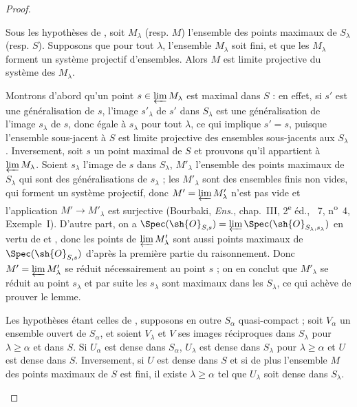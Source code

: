 \begin{proof}
\begin{lemma}[20.3.8.3]
\label{IV.20.3.8.3}
Sous les hypothèses de , soit $M_\lambda$ (resp. $M$) l'ensemble des points maximaux de $S_\lambda$ (resp. $S$).
Supposons que pour tout $\lambda$, l'ensemble $M_\lambda$ soit fini, et que les $M_\lambda$ forment un système projectif d'ensembles.
Alors $M$ est limite projective du système des $M_\lambda$.
\end{lemma}

Montrons d'abord qu'un point $s\in\varprojlim M_\lambda$ est maximal dans $S$ : en effet, si $s'$ est une généralisation de $s$, l'image $s'_\lambda$ de $s'$ dans $S_\lambda$ est une généralisation de l'image $s_\lambda$ de $s$, donc égale à $s_\lambda$ pour tout $\lambda$, ce qui implique $s'=s$, puisque l'ensemble sous-jacent à $S$ est limite projective des ensembles sous-jacents aux $S_\lambda$ .
Inversement, soit $s$ un point maximal de $S$ et prouvons qu'il appartient à $\varprojlim M_\lambda$.
Soient $s_\lambda$ l'image de $s$ dans $S_\lambda$, $M'_\lambda$ l'ensemble des points maximaux de $S_\lambda$ qui sont des généralisations de $s_\lambda$ ; les $M'_\lambda$ sont des ensembles finis non vides, qui forment un système projectif, donc $M'=\varprojlim M'_\lambda$ n'est pas vide et l'application $M'\to M'_\lambda$ est surjective (Bourbaki, \emph{Ens.}, chap.~III, 2\textsuperscript{e} éd., \textsection~7, n\textsuperscript{o}~4, Exemple~I).
D'autre part, on a $\Spec(\sh{O}_{S,s})=\varprojlim\Spec(\sh{O}_{S_\lambda,s_\lambda})$ en vertu de  et , donc les points de $\varprojlim M'_\lambda$ sont aussi points maximaux de $\Spec(\sh{O}_{S,s})$ d'après la première partie du raisonnement.
Donc $M'=\varprojlim M'_\lambda$ se réduit nécessairement au point $s$ ; on en conclut que $M'_\lambda$ se réduit au point $s_\lambda$ et par suite les $s_\lambda$ sont maximaux dans les $S_\lambda$, ce qui achève de prouver le lemme.

\begin{lemma}[20.3.8.4]
\label{IV.20.3.8.4}
Les hypothèses étant celles de , supposons en outre $S_\alpha$ quasi-compact ; soit $V_\alpha$ un ensemble ouvert de $S_\alpha$, et soient $V_\lambda$ et $V$ ses images réciproques dans $S_\lambda$ pour $\lambda\geq\alpha$ et dans $S$.
Si $U_\alpha$ est dense dans $S_\alpha$, $U_\lambda$ est dense dans $S_\lambda$ pour $\lambda\geq\alpha$ et $U$ est dense dans $S$.
Inversement, si $U$ est dense dans $S$ et si de plus l'ensemble $M$ des points maximaux de $S$ est fini, il existe $\lambda\geq\alpha$ tel que $U_\lambda$ soit dense dans $S_\lambda$.
\end{lemma}


\end{proof}
